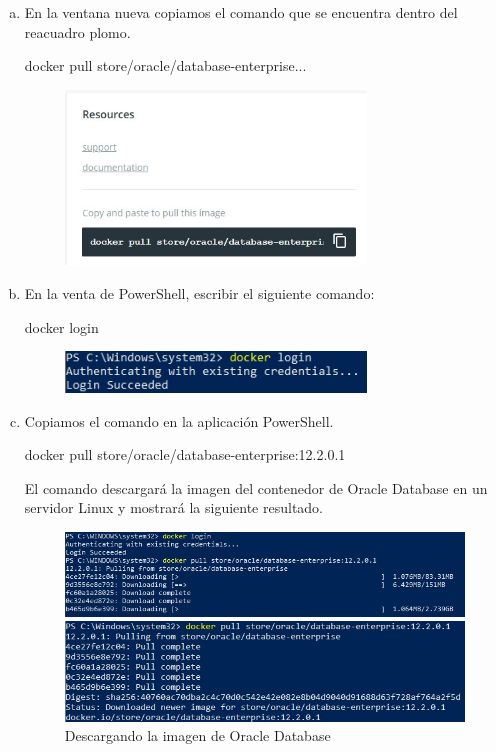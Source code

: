 \documentclass[preprint,12pt]{elsarticle}
\begin{document}
\begin{enumerate}[a)]
\item En la ventana nueva copiamos el comando que se encuentra dentro del reacuadro plomo.
\begin{center}docker pull store/oracle/database-enterprise...\end{center}
\begin{figure}[htb]
	\begin{center}
		\includegraphics[width=8cm]{./IMAGENES/Docker8_04}
	\end{center}
\end{figure}
\item En la venta de PowerShell, escribir el siguiente comando:
\begin{center}docker login\end{center}
\begin{figure}[htb]
	\begin{center}
		\includegraphics[width=8cm]{./IMAGENES/Docker8_20}
	\end{center}
\end{figure}
\item Copiamos el comando en la aplicación PowerShell. \begin{center}docker pull store/oracle/database-enterprise:12.2.0.1\end{center}
El comando descargará la imagen del contenedor de Oracle Database en un servidor Linux y mostrará la siguiente resultado.
\begin{figure}[htb]
	\begin{center}
		\includegraphics[width=12cm]{./IMAGENES/Docker8_06}
		\caption{Descargando la imagen de Oracle Database}
		\bigskip
		\includegraphics[width=12cm]{./IMAGENES/Docker8_07}
	\end{center}
\end{figure}



\end{enumerate}
\end{document}
